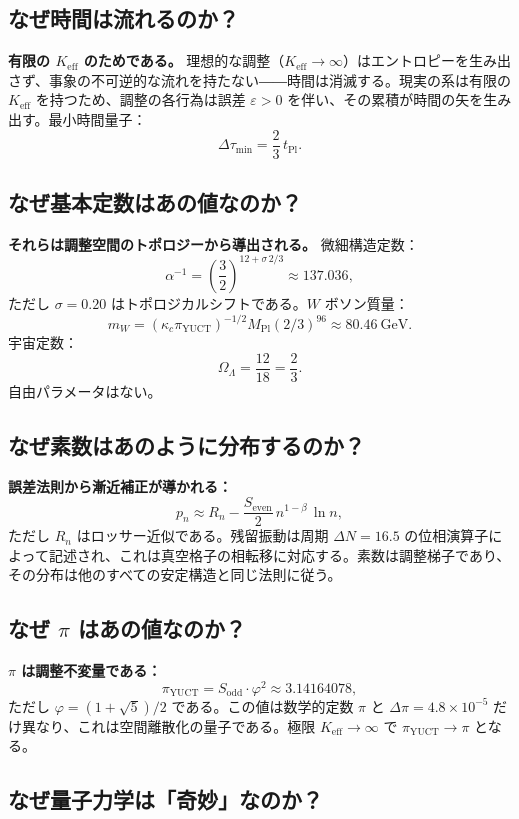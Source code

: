 \documentclass[12pt,a4paper]{article}
\newcommand{\Keff}{K_{\mathrm{eff}}}
\newcommand{\kappac}{\kappa_c}
\newcommand{\eps}{\varepsilon}
\newcommand{\betaf}{\beta}
\newcommand{\Sodd}{S_{\mathrm{odd}}}
\newcommand{\Seven}{S_{\mathrm{even}}}
\newcommand{\tPl}{t_{\mathrm{Pl}}}
\newcommand{\piYUCT}{\pi_{\mathrm{YUCT}}}
\begin{document}
	\subsection{なぜ時間は流れるのか？}
	
	\textbf{有限の \(\Keff\) のためである。} 理想的な調整（\(\Keff \to \infty\)）はエントロピーを生み出さず、事象の不可逆的な流れを持たない――時間は消滅する。現実の系は有限の \(\Keff\) を持つため、調整の各行為は誤差 \(\eps > 0\) を伴い、その累積が時間の矢を生み出す。最小時間量子：
	\[
	\Delta \tau_{\min} = \frac{2}{3}\,\tPl.
	\]
	
	\subsection{なぜ基本定数はあの値なのか？}
	
	\textbf{それらは調整空間のトポロジーから導出される。} 微細構造定数：
	\[
	\alpha^{-1} = \left(\frac{3}{2}\right)^{12 + \sigma\,2/3} \approx 137.036,
	\]
	ただし \(\sigma = 0.20\) はトポロジカルシフトである。\(W\) ボソン質量：
	\[
	m_W = (\kappac \piYUCT)^{-1/2} M_{\mathrm{Pl}} (2/3)^{96} \approx 80.46\ \text{GeV}.
	\]
	宇宙定数：
	\[
	\Omega_\Lambda = \frac{12}{18} = \frac{2}{3}.
	\]
	自由パラメータはない。
	
	\subsection{なぜ素数はあのように分布するのか？}
	
	\textbf{誤差法則から漸近補正が導かれる：}
	\[
	p_n \approx R_n - \frac{\Seven}{2}\, n^{1-\betaf}\,\ln n,
	\]
	ただし \(R_n\) はロッサー近似である。残留振動は周期 \(\Delta N = 16.5\) の位相演算子によって記述され、これは真空格子の相転移に対応する。素数は調整梯子であり、その分布は他のすべての安定構造と同じ法則に従う。
	
	\subsection{なぜ \(\pi\) はあの値なのか？}
	
	\textbf{\(\pi\) は調整不変量である：}
	\[
	\piYUCT = \Sodd \cdot \varphi^2 \approx 3.14164078,
	\]
	ただし \(\varphi = (1+\sqrt{5})/2\) である。この値は数学的定数 \(\pi\) と \(\Delta\pi = 4.8\times10^{-5}\) だけ異なり、これは空間離散化の量子である。極限 \(\Keff \to \infty\) で \(\piYUCT \to \pi\) となる。
	
	\subsection{なぜ量子力学は「奇妙」なのか？}
	
\end{document}
